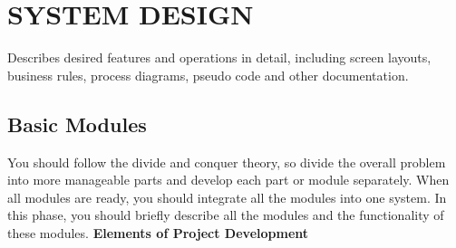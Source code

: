
\chapter{SYSTEM DESIGN} %

\label{Chapter5} %


Describes desired features and operations in detail, including screen layouts, business rules, process diagrams, pseudo code and other documentation.
\section{Basic Modules}
You should follow the divide and conquer theory, so divide the overall problem into more manageable parts and develop each part or module separately. When all modules are ready, you should integrate all the modules into one system. In this phase, you should briefly describe all the modules and the functionality of these modules.
\textbf{Elements of Project Development}






